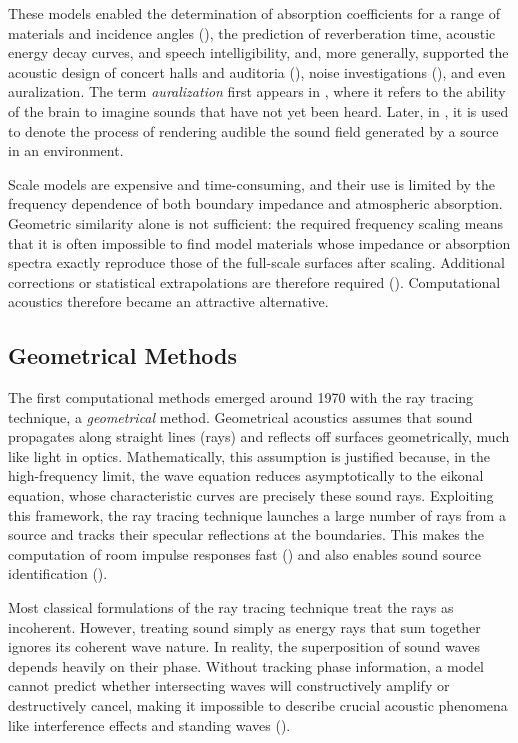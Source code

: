 \documentclass{Configuration_Files/PoliMi3i_thesis}
\begin{document}
These models enabled the determination of absorption coefficients for a range of materials and incidence angles (\cite{hunt_investigation_1939}), the prediction of reverberation time, acoustic energy decay curves, and speech intelligibility, and, more generally, supported the acoustic design of concert halls and auditoria (\cite{hardy_techniques_1950,knudsen_model_1969}), noise investigations (\cite{morgan_use_1961}), and even auralization. The term \emph{auralization} first appears in \cite{martin_you_1952}, where it refers to the ability of the brain to imagine sounds that have not yet been heard. Later, in \cite{kleiner_auralization_1993}, it is used to denote the process of rendering audible the sound field generated by a source in an environment.

Scale models are expensive and time-consuming, and their use is limited by the frequency dependence of both boundary impedance and atmospheric absorption. Geometric similarity alone is not sufficient: the required frequency scaling means that it is often impossible to find model materials whose impedance or absorption spectra exactly reproduce those of the full-scale surfaces after scaling. Additional corrections or statistical extrapolations are therefore required (\cite{hunt_investigation_1939}). Computational acoustics therefore became an attractive alternative.

\subsection{Geometrical Methods}
The first computational methods emerged around 1970 with the ray tracing technique, a \emph{geometrical} method. Geometrical acoustics assumes that sound propagates along straight lines (rays) and reflects off surfaces geometrically, much like light in optics. Mathematically, this assumption is justified because, in the high-frequency limit, the wave equation reduces asymptotically to the eikonal equation, whose characteristic curves are precisely these sound rays. Exploiting this framework, the ray tracing technique launches a large number of rays from a source and tracks their specular reflections at the boundaries. This makes the computation of room impulse responses fast (\cite{krokstad_calculating_1968,schroeder_digital_1970,schroeder_computer_1973}) and also enables sound source identification (\cite{luzzato_simple_1986}).

Most classical formulations of the ray tracing technique treat the rays as incoherent. However, treating sound simply as energy rays that sum together ignores its coherent wave nature. In reality, the superposition of sound waves depends heavily on their phase. Without tracking phase information, a model cannot predict whether intersecting waves will constructively amplify or destructively cancel, making it impossible to describe crucial acoustic phenomena like interference effects and standing waves (\cite{funkhouser_beam_1998,kuttruff_acoustics_2007,kuttruff_room_2009}).
\end{document}
